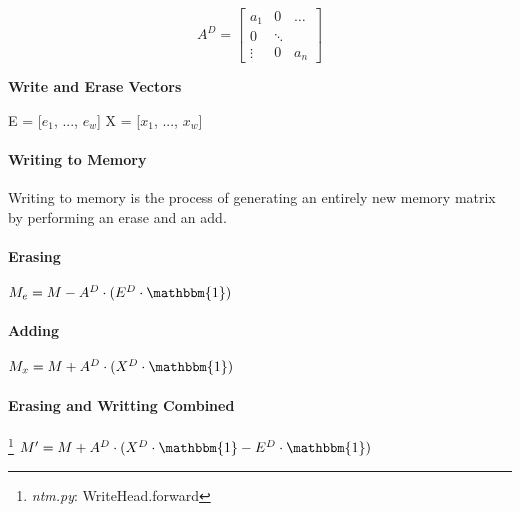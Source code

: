 \documentclass[a4paper]{article}
\begin{document}
\[ A^D = \begin{bmatrix} 

    a_{1} 	& 	0 		& 	\dots 	\\
    0   	&   	\ddots 		&       	\\
    \vdots 	&       0  		&   	a_{n} 

\end{bmatrix}
\]

\textbf{Write and Erase Vectors}

E = [$e_1$, ..., $e_w$]
X = [$x_1$, ..., $x_w$]

\paragraph{Writing to Memory}
Writing to memory is the process of generating an entirely new memory matrix by performing an erase and an add. 

\paragraph{Erasing} 
$M_{e} = M - A^D \cdot (E^D \cdot \mathbbm{1})$

\paragraph{Adding}
$M_{x} = M + A^D \cdot (X^D \cdot \mathbbm{1})$

\paragraph{Erasing and Writting Combined} \footnote{\textit{ntm.py}: WriteHead.forward}
$M' = M + A^D \cdot (X^D \cdot \mathbbm{1} - E^D \cdot \mathbbm{1})$



\end{document}
